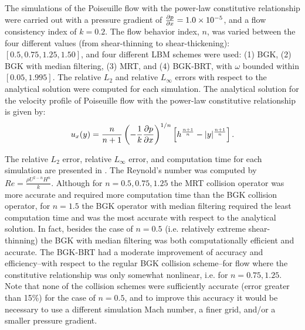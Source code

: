 The simulations of the Poiseuille flow with the power-law constitutive relationship were carried out with a pressure gradient of $\frac{\partial p}{\partial x} = 1.0 \times 10^{-5}$, and a flow consistency index of $k = 0.2$.
The flow behavior index, $n$, was varied between the four different values (from shear-thinning to shear-thickening): $[0.5, 0.75, 1.25, 1.50]$, and four different LBM schemes were used: (1) BGK, (2) BGK with median filtering, (3) MRT, and (4) BGK-BRT, with $\omega$ bounded within $[0.05, 1.995]$. 
The relative $L_2$ and relative $L_{\infty}$ errors with respect to the analytical solution were computed for each simulation.
The analytical solution for the velocity profile of Poiseuille flow with the power-law constitutive relationship is given by:
\begin{equation} \label{eq:analytical-power-law}
  u_x(y) = \frac{n}{n+1}\left(-\frac{1}{k}\frac{\partial p}{\partial x}\right)^{1/n}\left[h^{\frac{n+1}{n}} - |y|^{\frac{n+1}{n}}\right].
\end{equation}

The relative $L_2$ error, relative $L_{\infty}$ error, and computation time for each simulation are presented in .
The Reynold's number was computed by $Re = \frac{\rho U^{2-n} H^n}{k}$.
Although for $n = 0.5, 0.75, 1.25$ the MRT collision operator was more accurate and required more computation time than the BGK collision operator, for $n = 1.5$ the BGK operator with median filtering required the least computation time and was the most accurate with respect to the analytical solution.
In fact, besides the case of $n = 0.5$ (i.e. relatively extreme shear-thinning) the BGK with median filtering was both computationally efficient and accurate.
The BGK-BRT had a moderate improvement of accuracy and efficiency--with respect to the regular BGK collision scheme--for flow where the constitutive relationship was only somewhat nonlinear, i.e. for $n = 0.75, 1.25$.
Note that none of the collision schemes were sufficiently accurate (error greater than 15\%) for the case of $n = 0.5$, and to improve this accuracy it would be necessary to use a different simulation Mach number, a finer grid, and/or a smaller pressure gradient.



